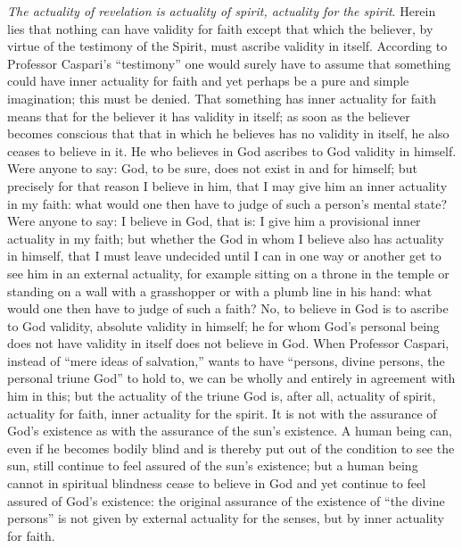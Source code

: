 \documentclass[12pt]{book}
\newcommand{\opage}[1]{\marginnote{\footnotesize\textit{[#1]}}}
\begin{document}
\emph{The actuality of revelation is actuality of spirit, actuality for
the spirit}. Herein lies that nothing can have validity for faith except
that which the believer, by virtue of the testimony of the Spirit, must
ascribe validity in itself. According to Professor Caspari's ``testimony''
one would surely have to assume that something could have inner actuality
for faith and yet perhaps be a pure and simple imagination; this must be
denied. That something has inner actuality for faith means that for the
believer it has validity in itself; as soon as the believer becomes
conscious that that in which he believes has no validity in itself, he
also ceases to believe in it. He who believes in God ascribes to God
validity in himself. Were anyone to say: God, to be sure, does not exist
in and for himself; but precisely for that reason I believe in him, that
I may give him an inner actuality in my faith: what would one then have to
judge of such a person's mental state? Were anyone to say: I believe in
God, that is: I give him a provisional inner actuality in my faith; but
whether the God in whom I believe also has actuality in himself, that I
must leave undecided until I can in one way or another get to see him in
an external actuality, for example sitting on a throne in the temple or
standing on a wall with a grasshopper or with a plumb line in his hand:
what would one then have to judge of such a faith? No, to believe in God
is to ascribe to God validity, absolute validity in himself; he for whom
God's personal being does not have validity in itself does not believe
in God. When Professor Caspari, instead of ``mere ideas of salvation,''
wants to have ``persons, divine persons, the personal triune God'' to hold
to, we can be wholly and entirely in agreement with him in this;
\opage{304}\setcounter{footnote}{0}%
but the actuality of the triune God is, after all, actuality of spirit,
actuality for faith, inner actuality for the spirit. It is not with the
assurance of God's existence as with the assurance of the sun's existence.
A human being can, even if he becomes bodily blind and is thereby put out
of the condition to see the sun, still continue to feel assured of the
sun's existence; but a human being cannot in spiritual blindness cease to
believe in God and yet continue to feel assured of God's existence: the
original assurance of the existence of ``the divine persons'' is not given
by external actuality for the senses, but by inner actuality for faith.
\end{document}
